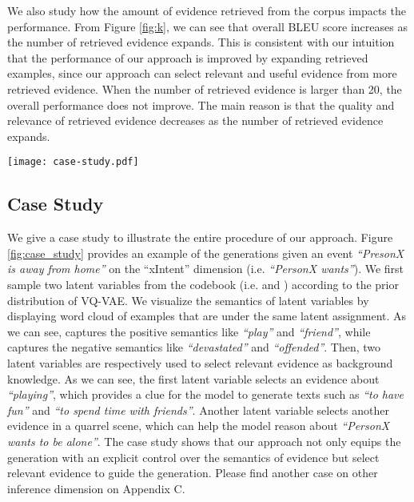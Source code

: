 \documentclass[11pt,a4paper]{article}
\begin{document}
We also study how the amount of evidence retrieved from the corpus impacts the performance. From Figure \ref{fig:k}, we can see that overall BLEU \mbox{score} increases as the number of retrieved evidence expands.
This is consistent with our intuition that the performance of our approach is improved by expanding retrieved examples, since our approach can select relevant and useful evidence from more retrieved evidence. When the number of retrieved evidence is larger than 20, the overall performance does not improve. The main reason is that the quality and relevance of retrieved evidence decreases as the number of retrieved evidence expands. 










\begin{figure*}[t!]
	\centering
	\texttt{[image: case-study.pdf]}
	\caption{An examples of Event2Mind dataset on the xIntent dimension (i.e. \textit{``PersonX wants''}).}
	\label{fig:case_study}
\end{figure*}

\subsection{Case Study}
We give a case study to illustrate the entire procedure of our approach. Figure \ref{fig:case_study} provides an example of the generations given an event \textit{``PresonX is away from home''} on the ``xIntent'' dimension (i.e. \textit{``PersonX wants''}). We first sample two latent variables from the codebook (i.e.  and ) according to the prior distribution of VQ-VAE. We visualize the semantics of latent variables by displaying word cloud of examples that are under the same latent assignment. As we can see,  captures the positive semantics like \textit{``play''} and \textit{``friend''}, while  captures the negative semantics like \textit{``devastated''} and \textit{``offended''}. Then, two latent variables are respectively used to select relevant evidence as background knowledge. As we can see, the first latent variable selects an evidence about \textit{``playing''}, which provides a clue for the model to generate texts such as \textit{``to have fun''} and \textit{``to spend time with friends''}. Another latent variable selects another evidence in a quarrel scene, which can help the model reason about \textit{``PersonX wants to be alone''}. The case study shows that our approach not only equips the generation with an explicit control over the semantics of evidence but select relevant evidence to guide the generation. Please find another case on other inference dimension on Appendix C.
\end{document}

